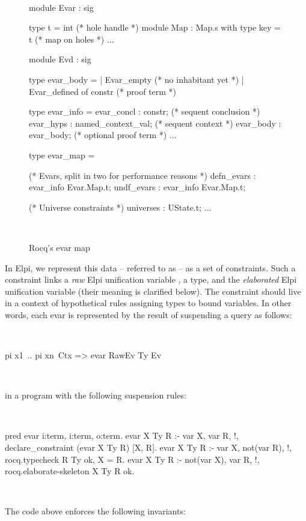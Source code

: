 \documentclass[a4paper, 11pt]{book}
\newenvironment{elpicode}
  {\VerbatimEnvironment~\\\begin{elpibox}\begin{xelpicode}}{\end{xelpicode}
\end{elpibox}\\}
\newenvironment{ocamlcode}
  {\VerbatimEnvironment~\\\begin{ocamlbox}\begin{xocamlcode}}{\end{xocamlcode}
\end{ocamlbox}\\}
\begin{document}
\begin{figure}[h]
\begin{ocamlcode}
module Evar : sig

  type t = int                             (* hole handle    *)
  module Map : Map.s with type key = t     (* map on holes   *)
  ...

module Evd : sig

  type evar_body =
    | Evar_empty                      (* no inhabitant yet   *)
    | Evar_defined of constr          (* proof term          *)

  type evar_info = {
    evar_concl : constr;              (* sequent conclusion  *)
    evar_hyps  : named_context_val;   (* sequent context     *)
    evar_body  : evar_body;           (* optional proof term *)
    ...
  }

  type evar_map = {
    (* Evars, split in two for performance reasons *)
    defn_evars : evar_info Evar.Map.t;
    undf_evars : evar_info Evar.Map.t;

    (* Universe constraints *)
    universes  : UState.t;
    ...
  }
\end{ocamlcode}
\caption{Rocq's evar map\label{fig:sigma}}
\end{figure}

In Elpi, we represent this data -- referred to as  -- as a set of
 constraints. Such a constraint links a \emph{raw} Elpi unification
variable , a type, and the \emph{elaborated} Elpi unification variable
 (their meaning is clarified below).
The constraint should live in a context of hypothetical rules 
assigning types to bound variables. In other words, each evar is represented
by the result of suspending a query as follows:

\begin{elpicode}
  pi x1\ .. pi xn\ Ctx => evar RawEv Ty Ev
\end{elpicode}

\noindent in a program with the following suspension rules:

\begin{elpicode}
pred evar i:term, i:term, o:term. %
evar X Ty R :- var X, var R,      !,
  declare_constraint (evar X Ty R) [X, R].
evar X Ty R :- var X, not(var R), !,
  rocq.typecheck R Ty ok, X = R.
evar X Ty R :- not(var X), var R, !,
  rocq.elaborate-skeleton X Ty R ok.
\end{elpicode}

\noindent
The code above enforces the following invariants:
\end{document}
